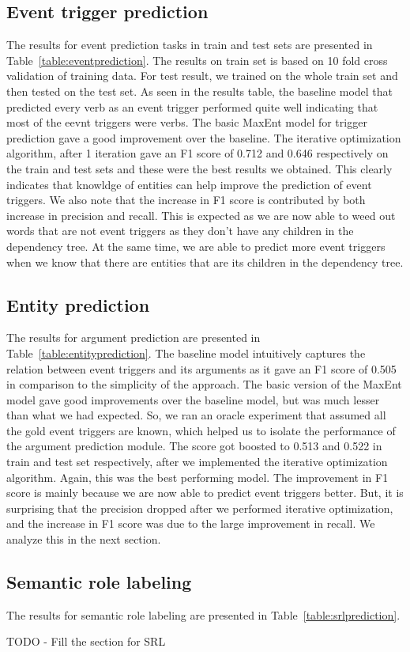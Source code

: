 \subsection{Event trigger prediction}
The results for event prediction tasks in train and test sets are presented in Table~\ref{table:eventprediction}. The results on train set is based on 10 fold cross validation of training data. For test result, we trained on the whole train set and then tested on the test set. As seen in the results table, the baseline model that predicted every verb as an event trigger performed quite well indicating that most of the eevnt triggers were verbs. The basic MaxEnt model for trigger prediction gave a good improvement over the baseline. The iterative optimization algorithm, after 1 iteration gave an F1 score of 0.712 and 0.646 respectively on the train and test sets and these were the best results we obtained. This clearly indicates that knowldge of entities can help improve the prediction of event triggers. We also note that the increase in F1 score is contributed by both increase in precision and recall. This is expected as we are now able to weed out words that are not event triggers as they don't have any children in the dependency tree. At the same time, we are able to predict more event triggers when we know that there are entities that are its children in the dependency tree.

\subsection{Entity prediction}
The results for argument prediction are presented in Table~\ref{table:entityprediction}. The baseline model intuitively captures the relation between event triggers and its arguments as it gave an F1 score of 0.505 in comparison to the simplicity of the approach. The basic version of the MaxEnt model gave good improvements over the baseline model, but was much lesser than what we had expected. So, we ran an oracle experiment that assumed all the gold event triggers are known, which helped us to isolate the performance of the argument prediction module. The score got boosted to 0.513 and 0.522 in train and test set respectively, after we implemented the iterative optimization algorithm. Again, this was the best performing model. The improvement in F1 score is mainly because we are now able to predict event triggers better. But, it is surprising that the precision dropped after we performed iterative optimization, and the increase in F1 score was due to the large improvement in recall. We analyze this in the next section.

\subsection{Semantic role labeling}
The results for semantic role labeling are presented in Table~\ref{table:srlprediction}. 

TODO - Fill the section for SRL